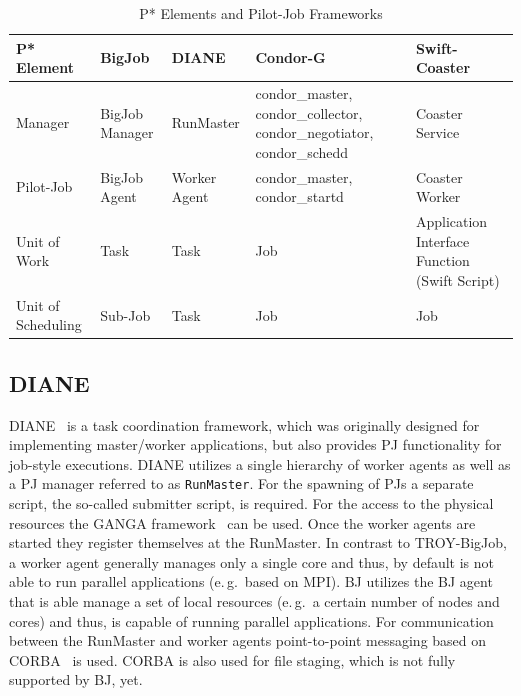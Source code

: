 \documentclass[conference,final]{IEEEtran}
\newcommand{\up}{\vspace*{-1em}}
\newcommand{\upp}{\vspace*{-0.5em}}
\begin{document}
% 
\upp

\begin{table}[t]
\centering
\begin{tabular}{|p{2.5cm}|p{3cm}|p{3cm}|p{3cm}|p{3cm}|}
\hline
\textbf{P* Element} &\textbf{BigJob} &\textbf{DIANE} &\textbf{Condor-G} &\textbf{Swift-Coaster}  \\
\hline
Manager &BigJob Manager & RunMaster & condor\_master, condor\_collector, condor\_negotiator, condor\_schedd &Coaster Service\\ 
\hline
Pilot-Job &BigJob Agent  & Worker Agent &condor\_master, condor\_startd &Coaster Worker\\
\hline
Unit of Work &Task &Task &Job &Application Interface Function (Swift Script)\\
\hline
Unit of Scheduling &Sub-Job &Task &Job &Job\\
\hline
\end{tabular}
\caption{P* Elements and Pilot-Job Frameworks\up} \label{table:bigjob-saga-diane}
\end{table}

\upp
\subsection{DIANE\upp\upp}

DIANE~\cite{Moscicki:908910} is a task coordination framework, which was
originally designed for implementing master/worker applications, but also
provides PJ functionality for job-style executions. DIANE utilizes a single
hierarchy of worker agents as well as a PJ manager referred to as
\texttt{RunMaster}.
For the spawning of PJs a separate script, the so-called submitter script, is
required. For the access to the physical resources the GANGA
framework~\cite{DBLP:journals/corr/abs-0902-2685} can be used.
Once the worker agents are started they register themselves at the RunMaster.
In contrast to TROY-BigJob, a worker agent generally manages only a single
core and thus, by default is not able to run parallel applications (e.\,g.\
based on MPI). BJ utilizes the BJ agent that is able manage a set of local
resources (e.\,g.\ a certain number of nodes and cores) and thus, is capable
of running parallel applications. For communication between the RunMaster and
worker agents point-to-point messaging based on CORBA~\cite{OMG-CORBA303:2004}
is used. CORBA is also used for file staging, which is not fully supported by
BJ, yet.
\end{document}
